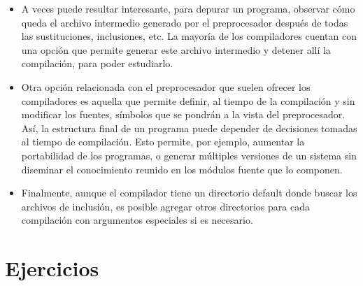 \begin{itemize}
	\item A veces puede resultar interesante, para depurar un programa, observar cómo queda el archivo
intermedio generado por el preprocesador después de todas las sustituciones, inclusiones, etc. La
mayoría de los compiladores cuentan con una opción que permite generar este archivo intermedio y
detener allí la compilación, para poder estudiarlo.
	\item Otra opción relacionada con el preprocesador que suelen ofrecer los compiladores es aquella que
permite definir, al tiempo de la compilación y sin modificar los fuentes, símbolos que se pondrán a la
vista del preprocesador. Así, la estructura final de un programa puede depender de decisiones tomadas
al tiempo de compilación. Esto permite, por ejemplo, aumentar la portabilidad de los programas, o
generar múltiples versiones de un sistema sin diseminar el conocimiento reunido en los módulos
fuente que lo componen.
	\item Finalmente, aunque el compilador tiene un directorio default donde buscar los archivos de inclusión,
es posible agregar otros directorios para cada compilación con argumentos especiales si es necesario.
\end{itemize}



\section{Ejercicios}

